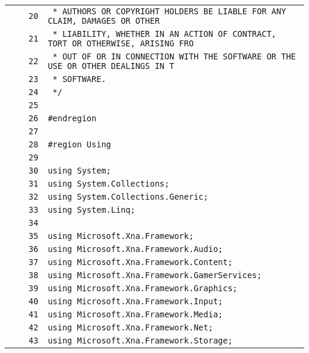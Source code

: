 \documentclass[a4paper,10pt]{article}
\begin{document}
\begin{longtable}[l]{lrrl}
\cellcolor{gray} &  & \verb~20~ & \verb~ * AUTHORS OR COPYRIGHT HOLDERS BE LIABLE FOR ANY CLAIM, DAMAGES OR OTHER~\\
\cellcolor{gray} &  & \verb~21~ & \verb~ * LIABILITY, WHETHER IN AN ACTION OF CONTRACT, TORT OR OTHERWISE, ARISING FRO~\\
\cellcolor{gray} &  & \verb~22~ & \verb~ * OUT OF OR IN CONNECTION WITH THE SOFTWARE OR THE USE OR OTHER DEALINGS IN T~\\
\cellcolor{gray} &  & \verb~23~ & \verb~ * SOFTWARE.~\\
\cellcolor{gray} &  & \verb~24~ & \verb~ */~\\
\cellcolor{gray} &  & \verb~25~ & \verb~~\\
\cellcolor{gray} &  & \verb~26~ & \verb~#endregion~\\
\cellcolor{gray} &  & \verb~27~ & \verb~~\\
\cellcolor{gray} &  & \verb~28~ & \verb~#region Using~\\
\cellcolor{gray} &  & \verb~29~ & \verb~~\\
\cellcolor{gray} &  & \verb~30~ & \verb~using System;~\\
\cellcolor{gray} &  & \verb~31~ & \verb~using System.Collections;~\\
\cellcolor{gray} &  & \verb~32~ & \verb~using System.Collections.Generic;~\\
\cellcolor{gray} &  & \verb~33~ & \verb~using System.Linq;~\\
\cellcolor{gray} &  & \verb~34~ & \verb~~\\
\cellcolor{gray} &  & \verb~35~ & \verb~using Microsoft.Xna.Framework;~\\
\cellcolor{gray} &  & \verb~36~ & \verb~using Microsoft.Xna.Framework.Audio;~\\
\cellcolor{gray} &  & \verb~37~ & \verb~using Microsoft.Xna.Framework.Content;~\\
\cellcolor{gray} &  & \verb~38~ & \verb~using Microsoft.Xna.Framework.GamerServices;~\\
\cellcolor{gray} &  & \verb~39~ & \verb~using Microsoft.Xna.Framework.Graphics;~\\
\cellcolor{gray} &  & \verb~40~ & \verb~using Microsoft.Xna.Framework.Input;~\\
\cellcolor{gray} &  & \verb~41~ & \verb~using Microsoft.Xna.Framework.Media;~\\
\cellcolor{gray} &  & \verb~42~ & \verb~using Microsoft.Xna.Framework.Net;~\\
\cellcolor{gray} &  & \verb~43~ & \verb~using Microsoft.Xna.Framework.Storage;~\\

\end{longtable}
\end{document}
